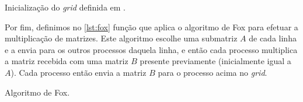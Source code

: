 \begin{listing}
	\caption{Inicialização do \emph{grid} definida em .}%
	\label{lst:setup-grid}
\end{listing}

Por fim, definimos no \cref{lst:fox} função que aplica o algoritmo de Fox para
efetuar a multiplicação de matrizes. Este algoritmo escolhe uma submatriz \(A\) de
cada linha e a envia para os outros processos daquela linha, e então cada processo
multiplica a matriz recebida com uma matriz \(B\) presente previamente (inicialmente 
igual a \(A\)). Cada processo então envia a matriz \(B\) para o processo acima no \emph{grid}.

\begin{listing}
	\caption{Algoritmo de Fox.}%
	\label{lst:fox}
\end{listing}
